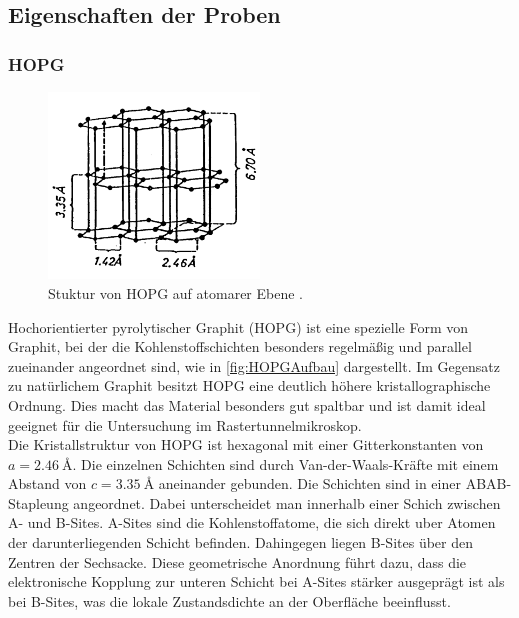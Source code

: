 \subsection{Eigenschaften der Proben}
\label{sec:EigenschaftenProben}

\subsubsection{HOPG}
\begin{figure}[h]
    \centering
    \includegraphics[width=0.5\textwidth]{Bilder/HOPGAufbau.png}
    \caption{Stuktur von HOPG auf atomarer Ebene \cite{ScanningTunnelingMicroscopy}.}
    \label{fig:HOPGAufbau}
\end{figure}
Hochorientierter pyrolytischer Graphit (HOPG) ist eine spezielle Form von Graphit, bei der die Kohlenstoffschichten besonders regelmäßig und parallel zueinander angeordnet sind, wie in \autoref{fig:HOPGAufbau} dargestellt. 
Im Gegensatz zu natürlichem Graphit besitzt HOPG eine deutlich höhere kristallographische Ordnung.
Dies macht das Material besonders gut spaltbar und ist damit ideal geeignet für die Untersuchung im Rastertunnelmikroskop.\\

Die Kristallstruktur von HOPG ist hexagonal mit einer Gitterkonstanten von $a = \SI{2.46}{\angstrom}$. 
Die einzelnen Schichten sind durch Van-der-Waals-Kräfte mit einem Abstand von $c = \SI{3.35}{\angstrom}$ aneinander gebunden. 
Die Schichten sind in einer ABAB-Stapleung angeordnet. Dabei unterscheidet man innerhalb einer Schich zwischen A- und B-Sites.
A-Sites sind die Kohlenstoffatome, die sich direkt uber Atomen der darunterliegenden Schicht befinden.
Dahingegen liegen B-Sites über den Zentren der Sechsacke.
Diese geometrische Anordnung führt dazu, dass die elektronische Kopplung zur unteren Schicht bei A-Sites stärker ausgeprägt ist als bei B-Sites, was die lokale Zustandsdichte an der Oberfläche beeinflusst.\\

